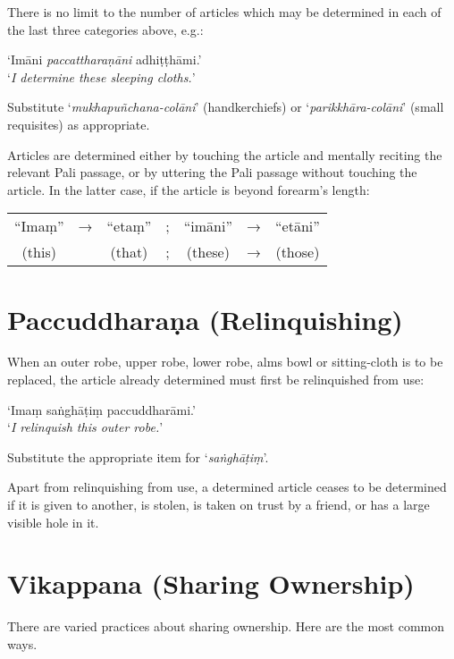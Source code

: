 
There is no limit to the number of articles which may be determined in each of
the last three categories above, e.g.:

‘Imāni \emph{paccattharaṇāni} adhiṭṭhāmi.’\\
‘\emph{I determine these sleeping cloths.}’

Substitute ‘\emph{mukhapuñchana-colāni}’ (handkerchiefs) or
‘\emph{parikkhāra-colāni}’ (small requisites) as appropriate.


Articles are determined either by touching the article and mentally reciting the
relevant Pali passage, or by uttering the Pali passage without touching the
article. In the latter case, if the article is beyond forearm's length:

\begin{tabular}{c c c c c c c}
“Imaṃ” & → & “etaṃ” & ; & “imāni” & → & “etāni”\\
(this) &   & (that) & ; & (these) & → & (those)\\
\end{tabular}


\section{Paccuddharaṇa (Relinquishing)}

When an outer robe, upper robe, lower robe, alms bowl or sitting-cloth is to be
replaced, the article already determined must first be relinquished from use:

‘Imaṃ saṅghāṭiṃ paccuddharāmi.’\\
‘\emph{I relinquish this outer robe.}’


Substitute the appropriate item for ‘\emph{saṅghāṭiṃ}’.

Apart from relinquishing from use, a determined article ceases to be determined
if it is given to another, is stolen, is taken on trust by a friend, or has a
large visible hole in it.

\section{Vikappana (Sharing Ownership)}

There are varied practices about sharing ownership. Here are the most common
ways.

